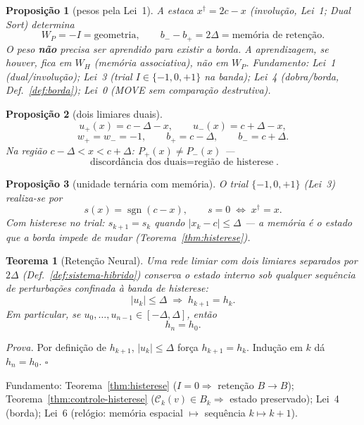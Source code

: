 \documentclass[11pt,a4paper]{article}
\newtheorem{teorema}{Teorema}
\newtheorem{proposicao}{Proposição}
\begin{document}
\begin{proposicao}[pesos pela Lei~1]\label{prop:pesos-lei1}
A estaca $x^{\dagger}=2c-x$ (involução, Lei~1; Dual Sort) determina
\[
\boxed{W_P=-I=\text{geometria}},
\qquad
\boxed{b_{-}-b_{+}=2\Delta=\text{memória de retenção}}.
\]
O peso \textbf{não} precisa ser aprendido para existir a borda. A
aprendizagem, se houver, fica em $W_{H}$ (memória associativa), não em
$W_P$. Fundamento: Lei~1 (dual/involução); Lei~3 (trial
$I\in\{-1,0,+1\}$ na banda); Lei~4 (dobra/borda,
Def.~\ref{def:borda}); Lei~0 (MOVE sem comparação destrutiva).
\end{proposicao}

\begin{proposicao}[dois limiares duais]\label{prop:dois-limiares}
\[
\boxed{u_{+}(x)=c-\Delta-x,\qquad u_{-}(x)=c+\Delta-x},
\]
\[
\boxed{w_{+}=w_{-}=-1,\qquad b_{+}=c-\Delta,\qquad b_{-}=c+\Delta}.
\]
Na região $c-\Delta<x<c+\Delta$: $P_{+}(x)\neq P_{-}(x)$ ---
\[
\boxed{\text{discordância dos duais}=\text{região de histerese}}.
\]
\end{proposicao}

\begin{proposicao}[unidade ternária com memória]\label{prop:trial-neural}
O trial $\{-1,0,+1\}$ (Lei~3) realiza-se por
\[
\boxed{
s(x)=\operatorname{sgn}(c-x),\qquad
s=0\;\Longleftrightarrow\; x^{\dagger}=x.
}
\]
Com histerese no trial: $s_{k+1}=s_k$ quando $|x_k-c|\le\Delta$ --- a
memória é o estado que a borda impede de mudar
(Teorema~\ref{thm:histerese}).
\end{proposicao}

\begin{teorema}[Retenção Neural]\label{thm:retencao-neural}
Uma rede limiar com dois limiares separados por $2\Delta$
(Def.~\ref{def:sistema-hibrido}) conserva o estado interno sob qualquer
sequência de perturbações confinada à banda de histerese:
\[
\boxed{|u_k|\le\Delta\;\Longrightarrow\; h_{k+1}=h_k}.
\]
Em particular, se $u_0,\ldots,u_{n-1}\in[-\Delta,\Delta]$, então
\[
\boxed{h_n=h_0}.
\]
\end{teorema}

\emph{Prova.} Por definição de $h_{k+1}$, $|u_k|\le\Delta$ força
$h_{k+1}=h_k$. Indução em $k$ dá $h_n=h_0$. $\square$

\noindent Fundamento: Teorema~\ref{thm:histerese}
($I=0\Rightarrow$ retenção $B\to B$); Teorema~\ref{thm:controle-histerese}
($\mathcal{C}_k(v)\in B_k\Rightarrow$ estado preservado); Lei~4 (borda);
Lei~6 (relógio: memória espacial $\mapsto$ sequência $k\mapsto k+1$).
\end{document}
